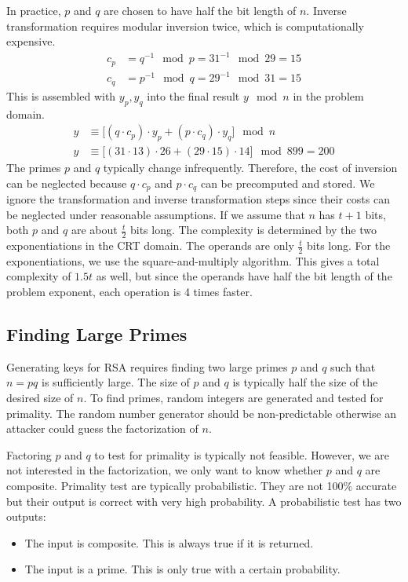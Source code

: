 \documentclass{math}
\begin{document}
In practice, \( p \) and \( q \) are chosen to have half the bit length of
\( n \). Inverse transformation requires modular inversion twice, which is
computationally expensive.
\begin{align*}
  c_p &= q^{-1}\mod p = 31^{-1}\mod29 = 15 \\
  c_q &= p^{-1}\mod q = 29^{-1}\mod31 = 15
\end{align*}
This is assembled with \( y_p,y_q \) into the final result \( y\mod n \) in
the problem domain.
\begin{align*}
  y &\equiv \bigg[(q\cdot c_p)\cdot y_p+(p\cdot c_q)\cdot y_q\bigg]\mod n \\
  y &\equiv \bigg[(31\cdot13)\cdot26+(29\cdot15)\cdot14\bigg]\mod899 = 200
\end{align*}
The primes \( p \) and \( q \) typically change infrequently. Therefore, the
cost of inversion can be neglected because \( q\cdot c_p \) and \( p\cdot c_q \)
can be precomputed and stored. We ignore the transformation and inverse
transformation steps since their costs can be neglected under reasonable
assumptions. If we assume that \( n \) has \( t+1 \) bits, both \( p \) and
\( q \) are about \( \frac{t}{2} \) bits long. The complexity is determined by
the two exponentiations in the CRT domain. The operands are only
\( \frac{t}{2} \) bits long. For the exponentiations, we use the
square-and-multiply algorithm. This gives a total complexity of \( 1.5t \) as
well, but since the operands have half the bit length of the problem exponent,
each operation is 4 times faster.

\subsection*{Finding Large Primes}
Generating keys for RSA requires finding two large primes \( p \) and \( q \)
such that \( n = pq \) is sufficiently large. The size of \( p \) and \( q \)
is typically half the size of the desired size of \( n \). To find primes,
random integers are generated and tested for primality. The random number
generator should be non-predictable otherwise an attacker could guess the
factorization of \( n \).
\par Factoring \( p \) and \( q \) to test for primality is typically not
feasible. However, we are not interested in the factorization, we only want to
know whether \( p \) and \( q \) are composite. Primality test are typically
probabilistic. They are not 100\% accurate but their output is correct with
very high probability. A probabilistic test has two outputs:
\begin{itemize}
  \item The input is composite. This is always true if it is returned.
  \item The input is a prime. This is only true with a certain probability.
\end{itemize}
\end{document}
